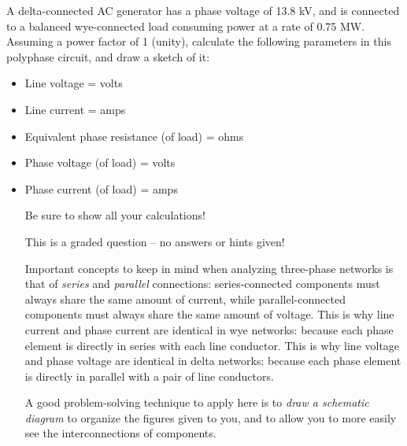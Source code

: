 

A delta-connected AC generator has a phase voltage of 13.8 kV, and is connected to a balanced wye-connected load consuming power at a rate of 0.75 MW.  Assuming a power factor of 1 (unity), calculate the following parameters in this polyphase circuit, and draw a sketch of it:

\begin{itemize}
\item{} Line voltage = \underbar{\hskip 50pt} volts
\vskip 5pt
\item{} Line current = \underbar{\hskip 50pt} amps
\vskip 5pt
\item{} Equivalent phase resistance (of load) = \underbar{\hskip 30pt} ohms
\vskip 5pt
\item{} Phase voltage (of load) = \underbar{\hskip 50pt} volts
\vskip 5pt
\item{} Phase current (of load) = \underbar{\hskip 50pt} amps
\vskip 5pt
\medskip

\noindent
Be sure to show all your calculations!

\vfil

\eject






This is a graded question -- no answers or hints given!







Important concepts to keep in mind when analyzing three-phase networks is that of {\it series} and {\it parallel} connections: series-connected components must always share the same amount of current, while parallel-connected components must always share the same amount of voltage.  This is why line current and phase current are identical in wye networks: because each phase element is directly in series with each line conductor.  This is why line voltage and phase voltage are identical in delta networks: because each phase element is directly in parallel with a pair of line conductors.

\vskip 10pt

A good problem-solving technique to apply here is to {\it draw a schematic diagram} to organize the figures given to you, and to allow you to more easily see the interconnections of components.  


\end{itemize}
